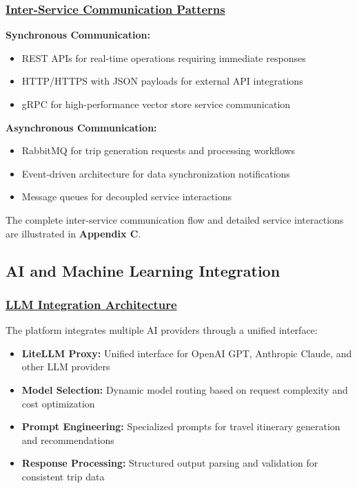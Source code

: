 \subsubsection*{\underline{Inter-Service Communication Patterns}}

\textbf{Synchronous Communication:}
\begin{itemize}
    \item REST APIs for real-time operations requiring immediate responses
    \item HTTP/HTTPS with JSON payloads for external API integrations
    \item gRPC for high-performance vector store service communication
\end{itemize}

\textbf{Asynchronous Communication:}
\begin{itemize}
    \item RabbitMQ for trip generation requests and processing workflows
    \item Event-driven architecture for data synchronization notifications
    \item Message queues for decoupled service interactions
\end{itemize}

The complete inter-service communication flow and detailed service interactions are illustrated in \textbf{Appendix C}.

\subsection{AI and Machine Learning Integration}

\subsubsection*{\underline{LLM Integration Architecture}}
The platform integrates multiple AI providers through a unified interface:

\begin{itemize}
    \item \textbf{LiteLLM Proxy:} Unified interface for OpenAI GPT, Anthropic Claude, and other LLM providers
    \item \textbf{Model Selection:} Dynamic model routing based on request complexity and cost optimization
    \item \textbf{Prompt Engineering:} Specialized prompts for travel itinerary generation and recommendations
    \item \textbf{Response Processing:} Structured output parsing and validation for consistent trip data
\end{itemize}

